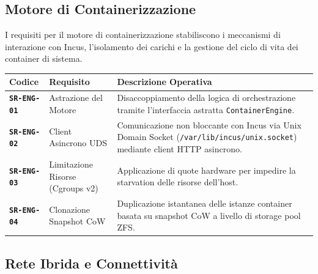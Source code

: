 \subsection{Motore di
Containerizzazione}\label{motore-di-containerizzazione}

I requisiti per il motore di containerizzazione stabiliscono i
meccanismi di interazione con Incus, l'isolamento dei carichi e la
gestione del ciclo di vita dei container di sistema.

\begin{longtable}[]{@{}
  >{\raggedright\arraybackslash}p{}
  >{\raggedright\arraybackslash}p{}
  >{\raggedright\arraybackslash}p{}@{}}
\toprule\noalign{}
\begin{minipage}[b]{\linewidth}\raggedright
Codice
\end{minipage} & \begin{minipage}[b]{\linewidth}\raggedright
Requisito
\end{minipage} & \begin{minipage}[b]{\linewidth}\raggedright
Descrizione Operativa
\end{minipage} \\
\midrule\noalign{}
\endhead
\bottomrule\noalign{}
\endlastfoot
\textbf{\passthrough{\lstinline!SR-ENG-01!}} & Astrazione del Motore &
Disaccoppiamento della logica di orchestrazione tramite l'interfaccia
astratta \passthrough{\lstinline!ContainerEngine!}. \\
\textbf{\passthrough{\lstinline!SR-ENG-02!}} & Client Asincrono UDS &
Comunicazione non bloccante con Incus via Unix Domain Socket
(\passthrough{\lstinline!/var/lib/incus/unix.socket!}) mediante client
HTTP asincrono. \\
\textbf{\passthrough{\lstinline!SR-ENG-03!}} & Limitazione Risorse
(Cgroups v2) & Applicazione di quote hardware per impedire la starvation
delle risorse dell'host. \\
\textbf{\passthrough{\lstinline!SR-ENG-04!}} & Clonazione Snapshot CoW &
Duplicazione istantanea delle istanze container basata su snapshot CoW a
livello di storage pool ZFS. \\
\end{longtable}

\subsection{Rete Ibrida e
Connettività}\label{rete-ibrida-e-connettivituxe0}

